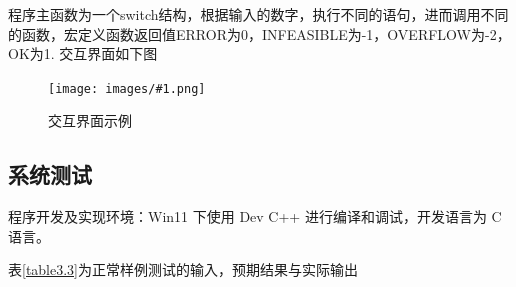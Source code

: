 \documentclass[supercite]{Experimental_Report}
\newcommand{\cfig}[3]{
	\begin{figure}[htb]
		\centering
		\texttt{[image: images/\#1.png]}
		\caption{#3}
		\label{fig:#1}
	\end{figure}
}
\theoremstyle{definition}
\begin{document}
程序主函数为一个switch结构，根据输入的数字，执行不同的语句，进而调用不同的函数，宏定义函数返回值ERROR为0，INFEASIBLE为-1，OVERFLOW为-2，OK为1.
交互界面如下图
\cfig{2.3.1}{0.8}{交互界面示例}
\clearpage
\subsection{系统测试}
程序开发及实现环境：Win11 下使用 Dev C++ 进行编译和调试，开发语言为 C 语言。\par

表\ref{table3.3}为正常样例测试的输入，预期结果与实际输出\par
\begin{table}[htbp]
	\centering
	\caption{正常样例测试}
	\label{table3.3}
\end{table}
\end{document}
